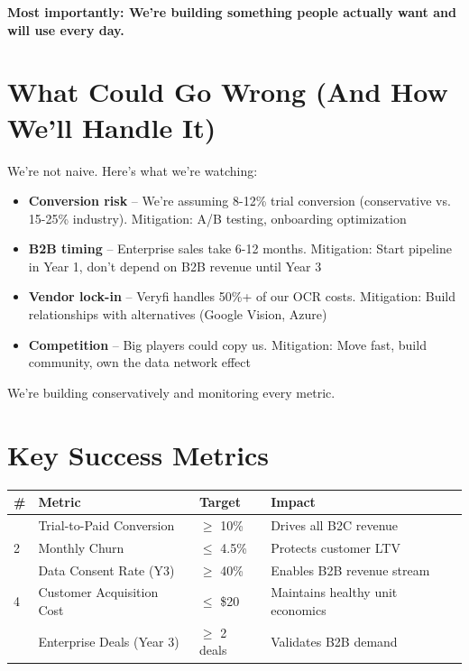 \documentclass[11pt,a4paper]{report}
\begin{document}
\textbf{Most importantly: We're building something people actually want and will use every day.}

\section{What Could Go Wrong (And How We'll Handle It)}

We're not naive. Here's what we're watching:

\begin{itemize}[leftmargin=2em, itemsep=3pt]
    \item \textbf{Conversion risk} -- We're assuming 8-12\% trial conversion (conservative vs. 15-25\% industry). Mitigation: A/B testing, onboarding optimization
    \item \textbf{B2B timing} -- Enterprise sales take 6-12 months. Mitigation: Start pipeline in Year 1, don't depend on B2B revenue until Year 3
    \item \textbf{Vendor lock-in} -- Veryfi handles 50\%+ of our OCR costs. Mitigation: Build relationships with alternatives (Google Vision, Azure)
    \item \textbf{Competition} -- Big players could copy us. Mitigation: Move fast, build community, own the data network effect
\end{itemize}

We're building conservatively and monitoring every metric.

\section{Key Success Metrics}

\begin{center}
\renewcommand{\arraystretch}{1.5}
\begin{tabular}{>{\centering\arraybackslash}p{1cm} >{\raggedright\arraybackslash}p{5cm} >{\centering\arraybackslash}p{3cm} >{\raggedright\arraybackslash}p{5cm}}
\toprule
\rowcolor{miloprimary!15}
\textbf{\#} & \textbf{Metric} & \textbf{Target} & \textbf{Impact} \\
\midrule
1 & Trial-to-Paid Conversion & $\geq$ 10\% & Drives all B2C revenue \\
\rowcolor{lightbg}
2 & Monthly Churn & $\leq$ 4.5\% & Protects customer LTV \\
3 & Data Consent Rate (Y3) & $\geq$ 40\% & Enables B2B revenue stream \\
\rowcolor{lightbg}
4 & Customer Acquisition Cost & $\leq$ \$20 & Maintains healthy unit economics \\
5 & Enterprise Deals (Year 3) & $\geq$ 2 deals & Validates B2B demand \\
\bottomrule
\end{tabular}
\end{center}
\end{document}
